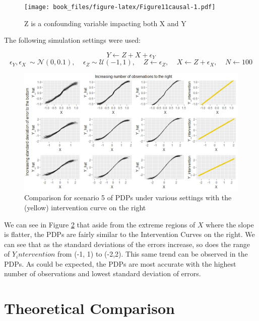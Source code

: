 \documentclass[
]{krantz}
\begin{document}
\begin{figure}
\centering
\texttt{[image: book\_files/figure-latex/Figure11causal-1.pdf]}
\caption{\label{fig:Figure11causal}Z is a confounding variable impacting both X and Y}
\end{figure}

The following simulation settings were used:

\[ Y \leftarrow Z + X + \epsilon_Y  \]
\[ \epsilon_Y,\epsilon_X ~ \sim \mathcal{N}(0, 0.1), \ \ \ \ \ \epsilon_Z \sim \mathcal{U}(-1,1), \ \ \ \ \ Z \leftarrow \epsilon_Z, \ \ \ \ \ X \leftarrow Z + \epsilon_X, \ \ \ \ \ N \leftarrow 100 \]

\begin{figure}

\includegraphics[width=1\linewidth]{images/scenario5_all} \hfill{}

\caption{Comparison for scenario 5 of PDPs under various settings with the (yellow) intervention curve on the right}\label{fig:Figure12causal}
\end{figure}

We can see in Figure \ref{fig:Figure12causal} that aside from the extreme regions of \(X\) where the slope is flatter, the PDPs are fairly similar to the Intervention Curves on the right. We can see that as the standard deviations of the errors increase, so does the range of \(Y_intervention\) from (-1, 1) to (-2,2). This same trend can be observed in the PDPs. As could be expected, the PDPs are most accurate with the highest number of observations and lowest standard deviation of errors.

\hypertarget{theoretical-comparison}{%
\section{Theoretical Comparison}\label{theoretical-comparison}}
\end{document}
